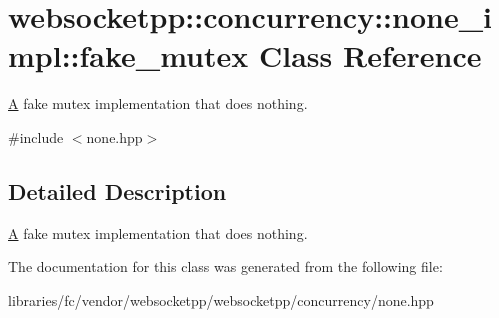 \hypertarget{classwebsocketpp_1_1concurrency_1_1none__impl_1_1fake__mutex}{}\section{websocketpp\+:\+:concurrency\+:\+:none\+\_\+impl\+:\+:fake\+\_\+mutex Class Reference}
\label{classwebsocketpp_1_1concurrency_1_1none__impl_1_1fake__mutex}


\mbox{\hyperlink{struct_a}{A}} fake mutex implementation that does nothing.  




{\ttfamily \#include $<$none.\+hpp$>$}



\subsection{Detailed Description}
\mbox{\hyperlink{struct_a}{A}} fake mutex implementation that does nothing. 

The documentation for this class was generated from the following file\+:\begin{DoxyCompactItemize}
\item 
libraries/fc/vendor/websocketpp/websocketpp/concurrency/none.\+hpp\end{DoxyCompactItemize}
